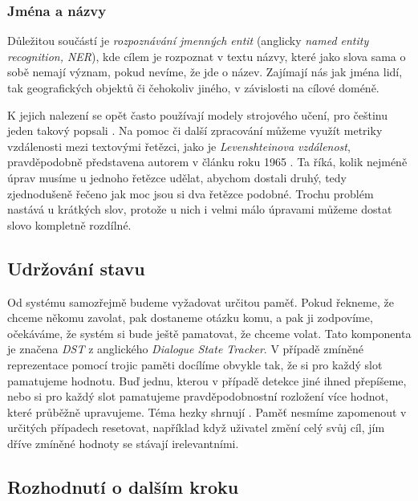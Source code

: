 \subsubsection{Jména a názvy}
Důležitou součástí je \textit{rozpoznávání jmenných entit} (anglicky
\textit{named entity recognition, NER}),
kde cílem je rozpoznat v textu názvy, které jako slova sama o sobě nemají
význam, pokud nevíme, že jde o název. Zajímají nás jak jména lidí, tak
geografických objektů či čehokoliv jiného, v závislosti na cílové doméně.

K jejich nalezení se opět často používají modely strojového učení, pro češtinu
jeden takový popsali \citet{ekstein_czech_2019}. Na pomoc či další zpracování
můžeme využít metriky vzdálenosti mezi textovými řetězci,
jako je \textit{Levenshteinova vzdálenost}, pravděpodobně představena autorem v
článku roku 1965 \citep{Levenshtein1965BinaryCC}. Ta říká, kolik nejméně úprav
musíme u jednoho řetězce udělat, abychom dostali druhý, tedy zjednodušeně řečeno
jak moc jsou si dva řetězce podobné. Trochu problém nastává u krátkých slov,
protože u nich i velmi málo úpravami můžeme dostat slovo kompletně rozdílné.

\subsection{Udržování stavu}\label{dst}

Od systému samozřejmě budeme vyžadovat určitou paměť. Pokud řekneme, že
chceme někomu zavolat, pak dostaneme otázku komu, a pak ji zodpovíme, očekáváme,
že systém si bude ještě pamatovat, že chceme volat. Tato komponenta je
značena \textit{DST} z anglického \textit{Dialogue State Tracker}. V případě
zmíněné reprezentace pomocí trojic paměti docílíme obvykle tak, že si pro každý
slot pamatujeme hodnotu. Buď jednu, kterou v případě detekce jiné ihned přepíšeme,
nebo si pro každý slot pamatujeme pravděpodobnostní rozložení více hodnot, které
průběžně upravujeme. Téma hezky shrnují \citet{williams_dialog_2016}.
Paměť nesmíme zapomenout v určitých případech
resetovat, například když uživatel změní celý svůj cíl, jím dříve
zmíněné hodnoty se stávají irelevantními.

\subsection{Rozhodnutí o dalším kroku}\label{dp}

